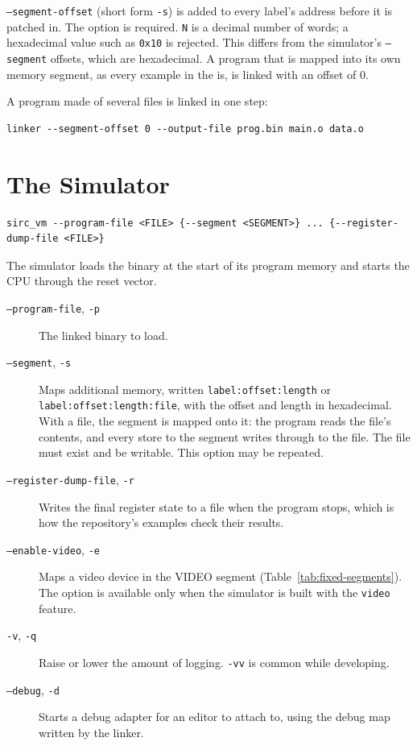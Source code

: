 \texttt{--segment-offset} (short form \texttt{-s}) is added to every label's address before it is patched in. The option is required. \texttt{N} is a decimal number of words; a hexadecimal value such as \texttt{0x10} is rejected. This differs from the simulator's \texttt{--segment} offsets, which are hexadecimal. A program that is mapped into its own memory segment, as every example in the \archmanual{} is, is linked with an offset of 0.

A program made of several files is linked in one step:

\begin{lstlisting}[language={}]
linker --segment-offset 0 --output-file prog.bin main.o data.o
\end{lstlisting}

\section{The Simulator}

\begin{lstlisting}[language={}]
sirc_vm --program-file <FILE> {--segment <SEGMENT>} ... {--register-dump-file <FILE>}
\end{lstlisting}

The simulator loads the binary at the start of its program memory and starts the CPU through the reset vector.

\begin{description}
	\item[\texttt{--program-file}, \texttt{-p}] The linked binary to load.
	\item[\texttt{--segment}, \texttt{-s}] Maps additional memory, written \texttt{label:\allowbreak offset:\allowbreak length} or
	      \texttt{label:\allowbreak offset:\allowbreak length:\allowbreak file}, with the offset and length in hexadecimal. With a file, the segment is mapped onto it: the program reads the file's contents, and every store to the segment writes through to the file. The file must exist and be writable. This option may be repeated.
	\item[\texttt{--register-dump-file}, \texttt{-r}] Writes the final register state to a file when the program stops,
	      which is how the repository's examples check their results.
	\item[\texttt{--enable-video}, \texttt{-e}] Maps a video device in the VIDEO segment (Table~\ref{tab:fixed-segments}). The option is available only when the simulator is built with the \texttt{video} feature.
	\item[\texttt{-v}, \texttt{-q}] Raise or lower the amount of logging. \texttt{-vv} is common while developing.
	\item[\texttt{--debug}, \texttt{-d}] Starts a debug adapter for an editor to attach to, using the debug map written
	      by the linker.
\end{description}

